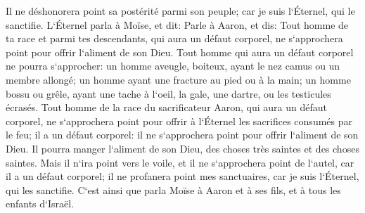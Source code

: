 \verse Il ne déshonorera point sa postérité parmi son peuple; car je suis l`Éternel, qui le sanctifie. 
\verse L`Éternel parla à Moïse, et dit: 
\verse Parle à Aaron, et dis: Tout homme de ta race et parmi tes descendants, qui aura un défaut corporel, ne s`approchera point pour offrir l`aliment de son Dieu. 
\verse Tout homme qui aura un défaut corporel ne pourra s`approcher: un homme aveugle, boiteux, ayant le nez camus ou un membre allongé; 
\verse un homme ayant une fracture au pied ou à la main; 
\verse un homme bossu ou grêle, ayant une tache à l`oeil, la gale, une dartre, ou les testicules écrasés. 
\verse Tout homme de la race du sacrificateur Aaron, qui aura un défaut corporel, ne s`approchera point pour offrir à l`Éternel les sacrifices consumés par le feu; il a un défaut corporel: il ne s`approchera point pour offrir l`aliment de son Dieu. 
\verse Il pourra manger l`aliment de son Dieu, des choses très saintes et des choses saintes. 
\verse Mais il n`ira point vers le voile, et il ne s`approchera point de l`autel, car il a un défaut corporel; il ne profanera point mes sanctuaires, car je suis l`Éternel, qui les sanctifie. 
\verse C`est ainsi que parla Moïse à Aaron et à ses fils, et à tous les enfants d`Israël. 

